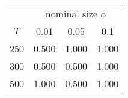 % 
\begin{tabular}{cccc}
  \hline
  & \multicolumn{3}{c}{nominal size $\alpha$} \\
 $T$ & 0.01 & 0.05 & 0.1 \\
 \hline
250 & 0.500 & 1.000 & 1.000 \\ 
  300 & 0.500 & 0.500 & 1.000 \\ 
  500 & 1.000 & 0.500 & 1.000 \\ 
   \hline
\end{tabular}
